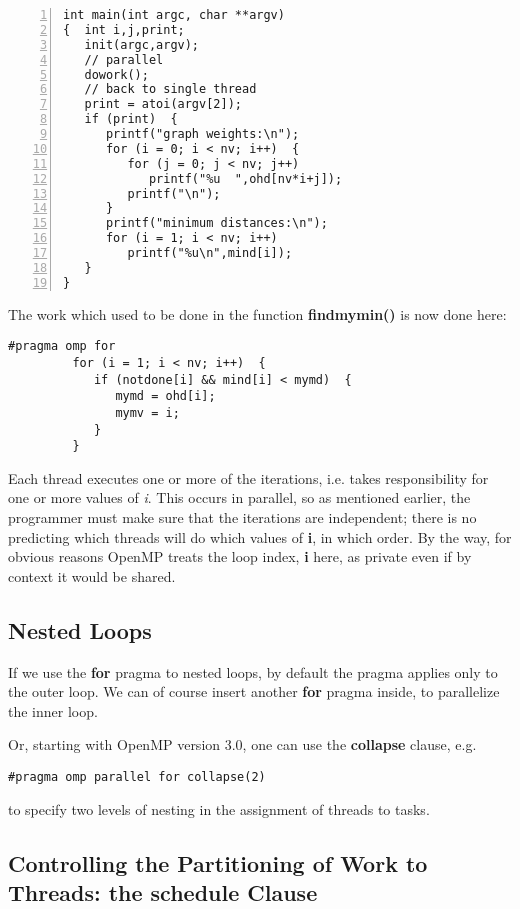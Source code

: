 \begin{Verbatim}[fontsize=\relsize{-2},numbers=left]
int main(int argc, char **argv)
{  int i,j,print;
   init(argc,argv);
   // parallel
   dowork();
   // back to single thread
   print = atoi(argv[2]);
   if (print)  {
      printf("graph weights:\n");
      for (i = 0; i < nv; i++)  {
         for (j = 0; j < nv; j++)
            printf("%u  ",ohd[nv*i+j]);
         printf("\n");
      }
      printf("minimum distances:\n");
      for (i = 1; i < nv; i++)
         printf("%u\n",mind[i]);
   }
}

\end{Verbatim}

The work which used to be done in the function {\bf findmymin()} is now
done here:

\begin{Verbatim}[fontsize=\relsize{-2}]
         #pragma omp for
         for (i = 1; i < nv; i++)  {
            if (notdone[i] && mind[i] < mymd)  {
               mymd = ohd[i];
               mymv = i;
            }
         }
\end{Verbatim}

Each thread executes one or more of the iterations, i.e. takes
responsibility for one or more values of {\it i}.  This occurs in
parallel, so as mentioned earlier, the programmer must make sure that
the iterations are independent; there is no predicting which threads
will do which values of {\bf i}, in which order.  By the way, for
obvious reasons OpenMP treats the loop index, {\bf i} here, as private
even if by context it would be shared.

\subsection{Nested Loops}

If we use the {\bf for} pragma to nested loops, by default the pragma
applies only to the outer loop.  We can of course insert another {\bf
for} pragma inside, to parallelize the inner loop.

Or, starting with OpenMP version 3.0, one can use the {\bf collapse}
clause, e.g.

\begin{Verbatim}[fontsize=\relsize{-2}]
#pragma omp parallel for collapse(2)
\end{Verbatim}

to specify two levels of nesting in the assignment of threads to tasks.

\subsection{Controlling the Partitioning of Work to Threads: the
schedule Clause}
\label{schedulework}

